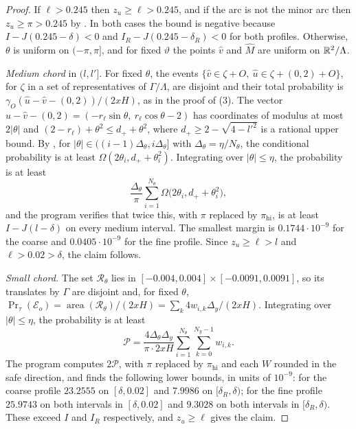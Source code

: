 \documentclass[11pt,colorlinks]{charlie}
\newcommand{\area}{\operatorname{area}}
\newcommand{\pihi}{\pi_{\mathrm{hi}}}
\begin{document}
\begin{proof}
If $\ell>0.245$ then $z_u\ge\ell>0.245$, and if the arc is not the minor arc then $z_u\ge\pi>0.245$ by . In both cases the bound is negative because $I-J(0.245-\delta)<0$ and $I_R-J(0.245-\delta_R)<0$ for both profiles. Otherwise, $\theta$ is uniform on $(-\pi,\pi]$, and for fixed $\vartheta$ the points $\hat v$ and $\hat M$ are uniform on $\mathbb{R}^2/\Lambda$.

\emph{Medium chord} in $(l,l']$. For fixed $\theta$, the events $\{\hat v\in\zeta+O,\ \hat u\in\zeta+(0,2)+O\}$, for $\zeta$ in a set of representatives of $\Gamma/\Lambda$, are disjoint and their total probability is $\gamma_O(\hat u-\hat v-(0,2))/(2xH)$, as in the proof of (3). The vector $\hat u-\hat v-(0,2)=(-r_\ell\sin\theta,\ r_\ell\cos\theta-2)$ has coordinates of modulus at most $2|\theta|$ and $(2-r_\ell)+\theta^2\le d_++\theta^2$, where $d_+\ge2-\sqrt{4-l'^2}$ is a rational upper bound. By , for $|\theta|\in((i-1)\Delta_\theta,i\Delta_\theta]$ with $\Delta_\theta=\eta/N_\theta$, the conditional probability is at least $\Omega(2\theta_i,d_++\theta_i^2)$. Integrating over $|\theta|\le\eta$, the probability is at least
\[
 \frac{\Delta_\theta}{\pi}\sum_{i=1}^{N_\theta}\Omega\big(2\theta_i,d_++\theta_i^2\big),
\]
and the program verifies that twice this, with $\pi$ replaced by $\pihi$, is at least $I-J(l-\delta)$ on every medium interval. The smallest margin is $0.1744\cdot10^{-9}$ for the coarse and $0.0405\cdot10^{-9}$ for the fine profile. Since $z_u\ge\ell>l$ and $\ell>0.02>\delta$, the claim follows.

\emph{Small chord.} The set $\mathcal R_\theta$ lies in $[-0.004,0.004]\times[-0.0091,0.0091]$, so its translates by $\Gamma$ are disjoint and, for fixed $\theta$, $\Pr_\tau(\mathcal E_o)=\area(\mathcal R_\theta)/(2xH)=\sum_k4w_{i,k}\Delta_y/(2xH)$. Integrating over $|\theta|\le\eta$, the probability is at least
\[
 \mathcal P=\frac{4\Delta_\theta\Delta_y}{\pi\cdot2xH}\sum_{i=1}^{N_\theta}\sum_{k=0}^{N_y-1}w_{i,k}.
\]
The program computes $2\mathcal P$, with $\pi$ replaced by $\pihi$ and each $W$ rounded in the safe direction, and finds the following lower bounds, in units of $10^{-9}$: for the coarse profile $23.2555$ on $[\delta,0.02]$ and $7.9986$ on $[\delta_R,\delta)$; for the fine profile $25.9743$ on both intervals in $[\delta,0.02]$ and $9.3028$ on both intervals in $[\delta_R,\delta)$. These exceed $I$ and $I_R$ respectively, and $z_u\ge\ell$ gives the claim.
\end{proof}
\end{document}
